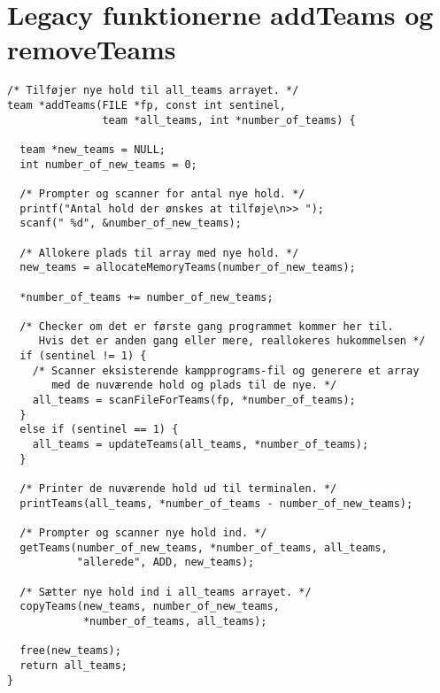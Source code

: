 \chapter{Legacy funktionerne addTeams og removeTeams}\label{ch:appFlabel}

\begin{verbatim}
/* Tilføjer nye hold til all_teams arrayet. */
team *addTeams(FILE *fp, const int sentinel, 
               team *all_teams, int *number_of_teams) {
               
  team *new_teams = NULL;
  int number_of_new_teams = 0;

  /* Prompter og scanner for antal nye hold. */
  printf("Antal hold der ønskes at tilføje\n>> ");
  scanf(" %d", &number_of_new_teams);

  /* Allokere plads til array med nye hold. */
  new_teams = allocateMemoryTeams(number_of_new_teams);

  *number_of_teams += number_of_new_teams;

  /* Checker om det er første gang programmet kommer her til. 
     Hvis det er anden gang eller mere, reallokeres hukommelsen */
  if (sentinel != 1) {
    /* Scanner eksisterende kampprograms-fil og generere et array 
       med de nuværende hold og plads til de nye. */
    all_teams = scanFileForTeams(fp, *number_of_teams);
  }
  else if (sentinel == 1) {
    all_teams = updateTeams(all_teams, *number_of_teams);
  }

  /* Printer de nuværende hold ud til terminalen. */
  printTeams(all_teams, *number_of_teams - number_of_new_teams);

  /* Prompter og scanner nye hold ind. */
  getTeams(number_of_new_teams, *number_of_teams, all_teams, 
           "allerede", ADD, new_teams);

  /* Sætter nye hold ind i all_teams arrayet. */
  copyTeams(new_teams, number_of_new_teams, 
            *number_of_teams, all_teams);

  free(new_teams);
  return all_teams;
}
\end{verbatim}


